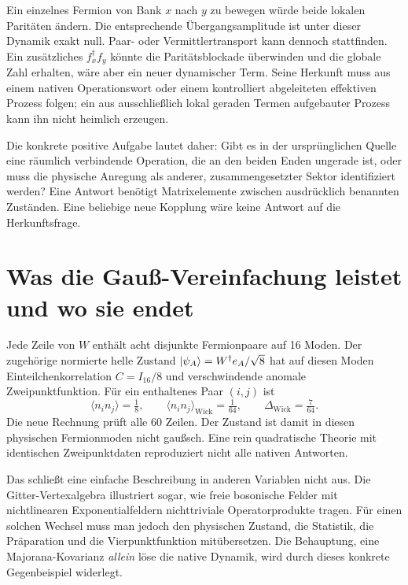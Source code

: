 Ein einzelnes Fermion von Bank $x$ nach $y$ zu bewegen würde beide lokalen Paritäten ändern. Die entsprechende Übergangsamplitude ist unter dieser Dynamik exakt null. Paar- oder Vermittlertransport kann dennoch stattfinden. Ein zusätzliches $f_x^\dagger f_y$ könnte die Paritätsblockade überwinden und die globale Zahl erhalten, wäre aber ein neuer dynamischer Term. Seine Herkunft muss aus einem nativen Operationswort oder einem kontrolliert abgeleiteten effektiven Prozess folgen; ein aus ausschließlich lokal geraden Termen aufgebauter Prozess kann ihn nicht heimlich erzeugen.

Die konkrete positive Aufgabe lautet daher: Gibt es in der ursprünglichen Quelle eine räumlich verbindende Operation, die an den beiden Enden ungerade ist, oder muss die physische Anregung als anderer, zusammengesetzter Sektor identifiziert werden? Eine Antwort benötigt Matrixelemente zwischen ausdrücklich benannten Zuständen. Eine beliebige neue Kopplung wäre keine Antwort auf die Herkunftsfrage.

\section{Was die Gauß-Vereinfachung leistet und wo sie endet}
Jede Zeile von $W$ enthält acht disjunkte Fermionpaare auf 16 Moden. Der zugehörige normierte helle Zustand $\lvert\psi_A\rangle=W^\dagger e_A/\sqrt8$ hat auf diesen Moden Einteilchenkorrelation $C=I_{16}/8$ und verschwindende anomale Zweipunktfunktion. Für ein enthaltenes Paar $(i,j)$ ist
\begin{equation}
\langle n_in_j\rangle=\tfrac18,
\qquad \langle n_in_j\rangle_{\mathrm{Wick}}=\tfrac1{64},
\qquad \Delta_{\mathrm{Wick}}=\tfrac7{64}.
\end{equation}
Die neue Rechnung prüft alle 60 Zeilen. Der Zustand ist damit in diesen physischen Fermionmoden nicht gaußsch. Eine rein quadratische Theorie mit identischen Zweipunktdaten reproduziert nicht alle nativen Antworten.

Das schließt eine einfache Beschreibung in anderen Variablen nicht aus. Die Gitter-Vertexalgebra illustriert sogar, wie freie bosonische Felder mit nichtlinearen Exponentialfeldern nichttriviale Operatorprodukte tragen. Für einen solchen Wechsel muss man jedoch den physischen Zustand, die Statistik, die Präparation und die Vierpunktfunktion mitübersetzen. Die Behauptung, eine Majorana-Kovarianz \emph{allein} löse die native Dynamik, wird durch dieses konkrete Gegenbeispiel widerlegt.
